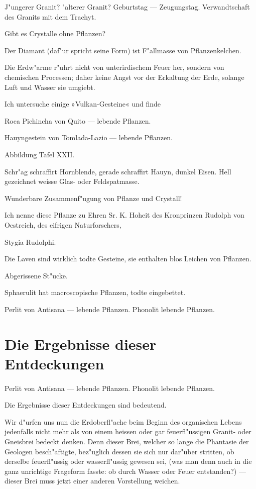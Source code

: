 \documentclass[a4paper, 11pt, oneside, german]{article}
\begin{document}
J"ungerer Granit? "alterer Granit? Geburtstag --- Zeugungstag. Verwandtschaft des Granits mit dem Trachyt.

Gibt es Crystalle ohne Pflanzen?

Der Diamant (daf"ur spricht seine Form) ist F"allmasse von Pflanzenkelchen.

Die Erdw"arme r"uhrt nicht von unterirdischem Feuer her, sondern von chemischen Processen; daher keine Angst vor der Erkaltung der Erde, solange Luft und Wasser sie umgiebt.

Ich untersuche einige »Vulkan-Gesteine« und finde

Roca Pichincha von Quito --- lebende Pflanzen.

Hauyngestein von Tomlada-Lazio --- lebende Pflanzen.

Abbildung Tafel XXII.

Schr"ag schraffirt Hornblende, gerade schraffirt Hauyn, dunkel Eisen. Hell gezeichnet weisse Glas- oder Feldspatmasse.

Wunderbare Zusammenf"ugung von Pflanze und Crystall!

Ich nenne diese Pflanze zu Ehren Sr. K. Hoheit des Kronprinzen Rudolph von Oestreich, des eifrigen Naturforschers,

Stygia Rudolphi.

Die Laven sind wirklich todte Gesteine, sie enthalten blos Leichen von Pflanzen.

Abgerissene St"ucke.

Sphaerulit hat macroscopische Pflanzen, todte eingebettet.

Perlit von Antisana --- lebende Pflanzen. Phonolit lebende Pflanzen.
\clearpage
\section{Die Ergebnisse dieser Entdeckungen}
\paragraph{}
Perlit von Antisana --- lebende Pflanzen. Phonolit lebende Pflanzen.

Die Ergebnisse dieser Entdeckungen sind bedeutend.

Wir d"urfen uns nun die Erdoberfl"ache beim Beginn des organischen Lebens jedenfalls nicht mehr als von einem heissen oder gar feuerfl"ussigen Granit- oder Gneisbrei bedeckt denken. Denn dieser Brei, welcher so lange die Phantasie der Geologen besch"aftigte, bez"uglich dessen sie sich nur dar"uber stritten, ob derselbe feuerfl"ussig oder wasserfl"ussig gewesen sei, (was man denn auch in die ganz unrichtige Frageform fasste: ob durch Wasser oder Feuer entstanden?) --- dieser Brei muss jetzt einer anderen Vorstellung weichen.
\end{document}

